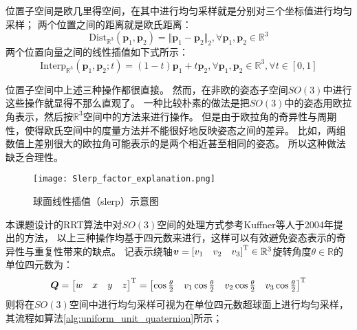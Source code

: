 位置子空间是欧几里得空间，在其中进行均匀采样就是分别对三个坐标值进行均匀采样；
两个位置之间的距离就是欧氏距离：
\begin{equation}
  \text{Dist}_{\mathbb{R}^3}(\bm{p}_1, \bm{p}_2) = \Vert \bm{p}_1 - \bm{p}_2 \Vert_2, \forall \bm{p}_1, \bm{p}_2 \in \mathbb{R}^3
  \label{equ:distance_in_R3}
\end{equation}
两个位置向量之间的线性插值如下式所示：
\begin{equation}
  \text{Interp}_{\mathbb{R}^3}(\bm{p}_1, \bm{p}_2; t) = 
  (1 - t)\bm{p}_1 + t\bm{p}_2, \forall \bm{p}_1, \bm{p}_2 \in \mathbb{R}^3, \forall t \in [0, 1]
  \label{equ:interpolation_in_R3}
\end{equation}

位置子空间中上述三种操作都很直接。
然而，在非欧的姿态子空间$SO(3)$中进行这些操作就显得不那么直观了。
一种比较朴素的做法是把$SO(3)$中的姿态用欧拉角表示，然后按$\mathbb{R}^3$空间中的方法来进行操作。
但是由于欧拉角的奇异性与周期性，使得欧氏空间中的度量方法并不能很好地反映姿态之间的差异。
比如，两组数值上差别很大的欧拉角可能表示的是两个相近甚至相同的姿态。
所以这种做法缺乏合理性。

\begin{figure}[ht]
  \centering
  \texttt{[image: Slerp\_factor\_explanation.png]}
  \caption{球面线性插值（slerp）示意图}
  \label{fig:slerp}
\end{figure}

本课题设计的RRT算法中对$SO(3)$空间的处理方式参考Kuffner等人于2004年提出的方法\cite{kuffner2004effective}，
以上三种操作均基于四元数来进行，这样可以有效避免姿态表示的奇异性与重复性带来的缺点。
记表示绕轴$\bm{v} = {[v_1 \quad v_2 \quad v_3]}^{\text{T}} \in \mathbb{R}^3$旋转角度$\theta \in \mathbb{R}$的单位四元数为：
\begin{equation}
  \bm{Q} = {
    \begin{bmatrix}
      w & x & y & z
    \end{bmatrix}
  }^{\text{T}}
   = {
     \begin{bmatrix}
       \cos{\frac{\theta}{2}} & v_1\cos{\frac{\theta}{2}} & v_2\cos{\frac{\theta}{2}} & v_3\cos{\frac{\theta}{2}}
     \end{bmatrix}
   }^{\text{T}}
   \label{equ:definition_of_unit_quaternion}
\end{equation}
则将在$SO(3)$空间中进行均匀采样可视为在单位四元数超球面上进行均匀采样，其流程如算法\ref{alg:uniform_unit_quaternion}所示；

